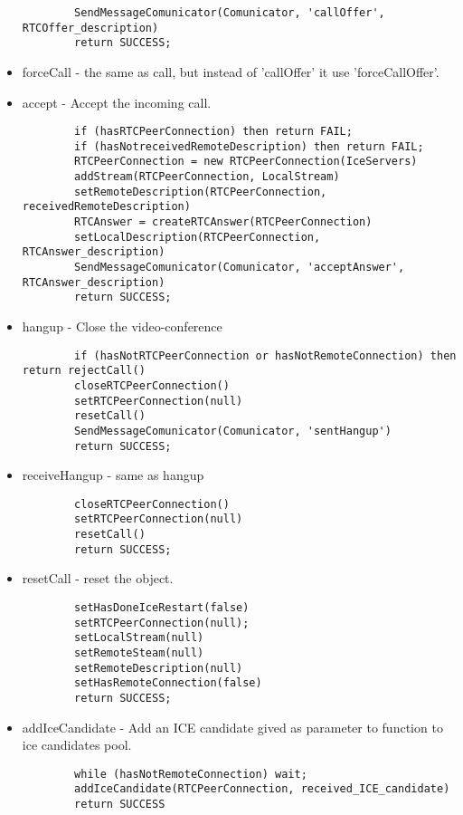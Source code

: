 \begin{itemize}
\begin{lstlisting}
        SendMessageComunicator(Comunicator, 'callOffer', RTCOffer_description)
        return SUCCESS;
    \end{lstlisting}
    \item forceCall - the same as call, but instead of 'callOffer' it use 'forceCallOffer'.
    \item accept - Accept the incoming call.
    \begin{lstlisting}
        if (hasRTCPeerConnection) then return FAIL;
        if (hasNotreceivedRemoteDescription) then return FAIL;
        RTCPeerConnection = new RTCPeerConnection(IceServers)
        addStream(RTCPeerConnection, LocalStream)
        setRemoteDescription(RTCPeerConnection, receivedRemoteDescription)
        RTCAnswer = createRTCAnswer(RTCPeerConnection)
        setLocalDescription(RTCPeerConnection, RTCAnswer_description)
        SendMessageComunicator(Comunicator, 'acceptAnswer', RTCAnswer_description)
        return SUCCESS;
    \end{lstlisting}
    \item hangup - Close the video-conference
    \begin{lstlisting}
        if (hasNotRTCPeerConnection or hasNotRemoteConnection) then return rejectCall()
        closeRTCPeerConnection()
        setRTCPeerConnection(null)
        resetCall()
        SendMessageComunicator(Comunicator, 'sentHangup')
        return SUCCESS;
    \end{lstlisting}
    \item receiveHangup - same as hangup
    \begin{lstlisting}
        closeRTCPeerConnection()
        setRTCPeerConnection(null)
        resetCall()
        return SUCCESS;
    \end{lstlisting}
    \item resetCall - reset the object.
    \begin{lstlisting}
        setHasDoneIceRestart(false)
        setRTCPeerConnection(null);
        setLocalStream(null)
        setRemoteSteam(null)
        setRemoteDescription(null)
        setHasRemoteConnection(false)
        return SUCCESS;
    \end{lstlisting}
    \item addIceCandidate - Add an ICE candidate gived as parameter to function to ice candidates pool.
    \begin{lstlisting}
        while (hasNotRemoteConnection) wait;
        addIceCandidate(RTCPeerConnection, received_ICE_candidate)
        return SUCCESS
    \end{lstlisting}

\end{itemize}
